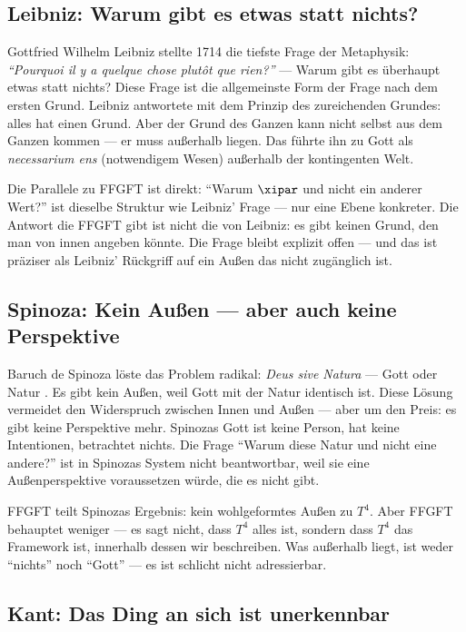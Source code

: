 \subsection{Leibniz: Warum gibt es etwas statt nichts?}

Gottfried Wilhelm Leibniz stellte 1714 die tiefste Frage der Metaphysik: \emph{``Pourquoi il y a quelque chose plutôt que rien?''} --- Warum gibt es überhaupt etwas statt nichts? \cite{Leibniz1714} Diese Frage ist die allgemeinste Form der Frage nach dem ersten Grund. Leibniz antwortete mit dem Prinzip des zureichenden Grundes: alles hat einen Grund. Aber der Grund des Ganzen kann nicht selbst aus dem Ganzen kommen --- er muss außerhalb liegen. Das führte ihn zu Gott als \emph{necessarium ens} (notwendigem Wesen) außerhalb der kontingenten Welt.

Die Parallele zu FFGFT ist direkt: ``Warum $\xipar$ und nicht ein anderer Wert?'' ist dieselbe Struktur wie Leibniz' Frage --- nur eine Ebene konkreter. Die Antwort die FFGFT gibt ist nicht die von Leibniz: es gibt keinen Grund, den man von innen angeben könnte. Die Frage bleibt explizit offen --- und das ist präziser als Leibniz' Rückgriff auf ein Außen das nicht zugänglich ist.

\subsection{Spinoza: Kein Außen --- aber auch keine Perspektive}

Baruch de Spinoza löste das Problem radikal: \emph{Deus sive Natura} --- Gott oder Natur \cite{Spinoza1677}. Es gibt kein Außen, weil Gott mit der Natur identisch ist. Diese Lösung vermeidet den Widerspruch zwischen Innen und Außen --- aber um den Preis: es gibt keine Perspektive mehr. Spinozas Gott ist keine Person, hat keine Intentionen, betrachtet nichts. Die Frage ``Warum diese Natur und nicht eine andere?'' ist in Spinozas System nicht beantwortbar, weil sie eine Außenperspektive voraussetzen würde, die es nicht gibt.

FFGFT teilt Spinozas Ergebnis: kein wohlgeformtes Außen zu $T^4$. Aber FFGFT behauptet weniger --- es sagt nicht, dass $T^4$ alles ist, sondern dass $T^4$ das Framework ist, innerhalb dessen wir beschreiben. Was außerhalb liegt, ist weder ``nichts'' noch ``Gott'' --- es ist schlicht nicht adressierbar.

\subsection{Kant: Das Ding an sich ist unerkennbar}

